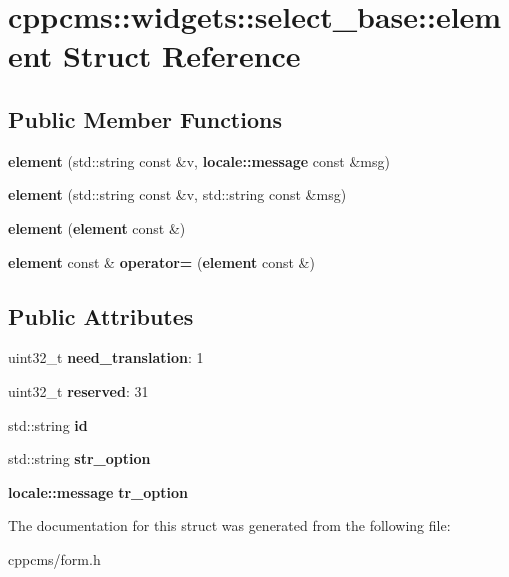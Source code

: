 \section{cppcms\-:\-:widgets\-:\-:select\-\_\-base\-:\-:element Struct Reference}
\label{structcppcms_1_1widgets_1_1select__base_1_1element}
\subsection*{Public Member Functions}
\begin{DoxyCompactItemize}
\item 
{\bfseries element} (std\-::string const \&v, {\bf locale\-::message} const \&msg)\label{structcppcms_1_1widgets_1_1select__base_1_1element_a2201a008a67419d33ddc6c141543ed6e}

\item 
{\bfseries element} (std\-::string const \&v, std\-::string const \&msg)\label{structcppcms_1_1widgets_1_1select__base_1_1element_a6a575261395968caa7086aaad3c7322c}

\item 
{\bfseries element} ({\bf element} const \&)\label{structcppcms_1_1widgets_1_1select__base_1_1element_a5cbd376bab3bc8c9efe56d4c41bf326f}

\item 
{\bf element} const \& {\bfseries operator=} ({\bf element} const \&)\label{structcppcms_1_1widgets_1_1select__base_1_1element_a5b9a12b09adef1c19ead2de703c26c59}

\end{DoxyCompactItemize}
\subsection*{Public Attributes}
\begin{DoxyCompactItemize}
\item 
uint32\-\_\-t {\bfseries need\-\_\-translation}\-: 1\label{structcppcms_1_1widgets_1_1select__base_1_1element_ac4a47dc24f69edf6aa32a34cf6040d7e}

\item 
uint32\-\_\-t {\bfseries reserved}\-: 31\label{structcppcms_1_1widgets_1_1select__base_1_1element_a5527142a43733b1963ef6723404c7e4c}

\item 
std\-::string {\bfseries id}\label{structcppcms_1_1widgets_1_1select__base_1_1element_adc7a822a128e5a77ef0dffa3c9bb1157}

\item 
std\-::string {\bfseries str\-\_\-option}\label{structcppcms_1_1widgets_1_1select__base_1_1element_a05a50952d7a19286f8fb671631b6983b}

\item 
{\bf locale\-::message} {\bfseries tr\-\_\-option}\label{structcppcms_1_1widgets_1_1select__base_1_1element_a81d4cfcdae5c17b6020bfbbfacc58e57}

\end{DoxyCompactItemize}


The documentation for this struct was generated from the following file\-:\begin{DoxyCompactItemize}
\item 
cppcms/form.\-h\end{DoxyCompactItemize}
